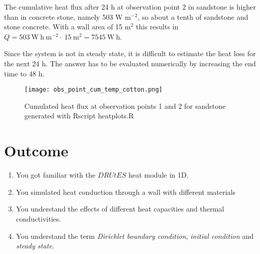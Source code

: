 \documentclass[
10pt, %
a4paper, %
oneside, %
headinclude,footinclude, %
BCOR5mm, %
]{scrartcl}
\begin{document}
The cumulative heat flux after 24 h at observation point 2 in sandstone is higher than in concrete stone, namely 503 W m$^{-2}$, so about a tenth of sandstone and stone concrete. With a wall area of 15 m$^2$ this results in $Q = 503~\mathrm{W~h~m^{-2}}\cdot~15~\mathrm{m^{2}}= 7545 ~\mathrm{W~h}$. 

Since the system is not in steady state, it is difficult to estimate the heat loss for the next 24 h. The answer has to be evaluated numerically by increasing the end time to 48 h. 

\begin{figure}[!h]
\centering
\texttt{[image: obs\_point\_cum\_temp\_cotton.png]}
\caption{\label{plot9} Cumulated heat flux at observation points 1 and 2 for sandstone generated with Rscript heatplots.R}
\end{figure}

\newpage
\newpage

\section{Outcome}
\begin{enumerate}
\item You got familiar with the $DRUtES$ heat module in 1D.
\item You simulated heat conduction through a wall with different materials
\item You understand the effects of different heat capacities and thermal conductivities.
\item You understand the term \emph{Dirichlet boundary condition}, \emph{initial condition} and \emph{steady state}.
\end{enumerate}



%


\end{document}
